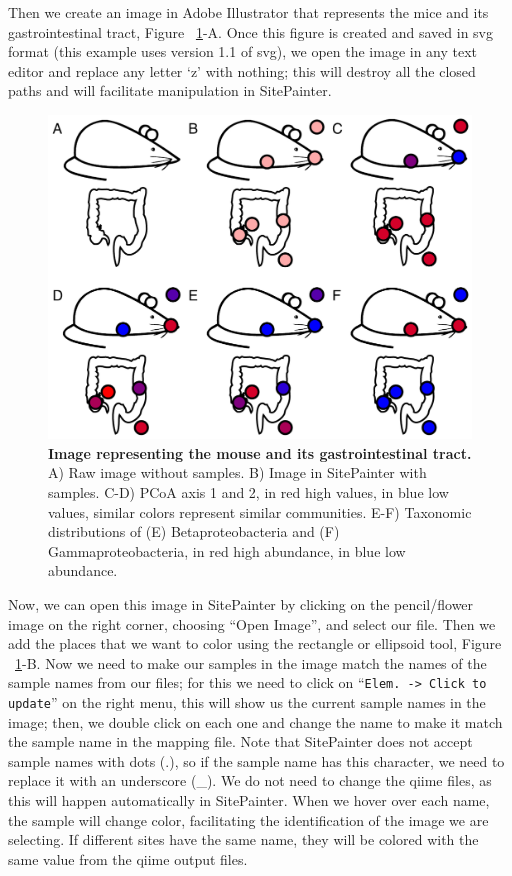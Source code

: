 Then we create an image in Adobe Illustrator that represents the mice and its gastrointestinal tract,
Figure ~\ref{bfigure19}-A. Once this figure is created and saved in \gls{svg} format (this example uses
version 1.1 of \gls{svg}), we open the image in any text editor and replace any letter ‘z’ with nothing;
this will destroy all the closed paths and will facilitate manipulation in SitePainter.

\begin{figure}[htbp]
\includegraphics[width=0.75\columnwidth]{chapter_book_figures/Figure_19.jpg}
\caption[Image representing the mouse and its gastrointestinal tract]{\textbf{Image representing the mouse and its gastrointestinal tract.}
A) Raw image without samples. B) Image in SitePainter with samples. C-D)
PCoA axis 1 and 2, in red high values, in blue low values, similar colors represent
similar communities. E-F) Taxonomic distributions of (E) Betaproteobacteria and (F)
Gammaproteobacteria, in red high abundance, in blue low abundance.}
\label{bfigure19}
\end{figure}

Now, we can open this image in SitePainter by clicking on the pencil/flower image on
the right corner, choosing “Open Image”, and select our file. Then we add the places
that we want to color using the rectangle or ellipsoid tool, Figure ~\ref{bfigure19}-B.
Now we need to make our samples in the image match the names of the sample names from our
files; for this we need to click on “\texttt{Elem. -> Click to update}” on the right menu,
this will show us the current sample names in the image; then, we double click on each one
and change the name to make it match the sample name in the mapping file. Note that
SitePainter does not accept sample names with dots (.), so if the sample name has this character,
we need to replace it with an underscore (\_). We do not need to change the \gls{qiime} files, as this
will happen automatically in SitePainter. When we hover over each name, the sample will change color,
facilitating the identification of the image we are selecting. If different sites have the same name,
they will be colored with the same value from the \gls{qiime} output files.


